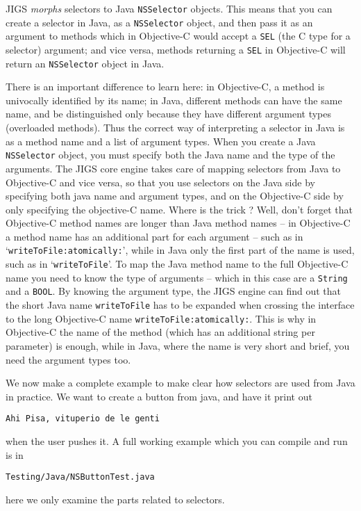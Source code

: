 JIGS {\sl morphs} selectors to Java \texttt{NSSelector} objects.  This
means that you can create a selector in Java, as a \texttt{NSSelector}
object, and then pass it as an argument to methods which in
Objective-C would accept a \texttt{SEL} (the C type for a selector)
argument; and vice versa, methods returning a \texttt{SEL} in
Objective-C will return an \texttt{NSSelector} object in Java.

There is an important difference to learn here: in Objective-C, a
method is univocally identified by its name; in Java, different
methods can have the same name, and be distinguished only because they
have different argument types (overloaded methods).  Thus the correct
way of interpreting a selector in Java is as a method name and a list
of argument types.  When you create a Java \texttt{NSSelector} object,
you must specify both the Java name and the type of the arguments.
The JIGS core engine takes care of mapping selectors from Java to
Objective-C and vice versa, so that you use selectors on the Java side
by specifying both java name and argument types, and on the
Objective-C side by only specifying the objective-C name.  Where is
the trick ?  Well, don't forget that Objective-C method names are
longer than Java method names -- in Objective-C a method name has an
additional part for each argument -- such as in
`\texttt{writeToFile:atomically:}', while in Java only the first part
of the name is used, such as in `\texttt{writeToFile}'.  To map the
Java method name to the full Objective-C name you need to know the
type of arguments -- which in this case are a \texttt{String} and a
\texttt{BOOL}.  By knowing the argument type, the JIGS engine can find
out that the short Java name \texttt{writeToFile} has to be expanded
when crossing the interface to the long Objective-C name
\texttt{writeToFile:atomically:}.  This is why in Objective-C the name 
of the method (which has an additional string per parameter) is
enough, while in Java, where the name is very short and brief, you
need the argument types too.

We now make a complete example to make clear how selectors are used
from Java in practice.  We want to create a button from java, and have
it print out
\begin{verbatim}
Ahi Pisa, vituperio de le genti
\end{verbatim}
when the user pushes it.  A full working example which you can compile
and run is in 
\begin{verbatim}
Testing/Java/NSButtonTest.java
\end{verbatim}
here we only examine the parts related to selectors.

